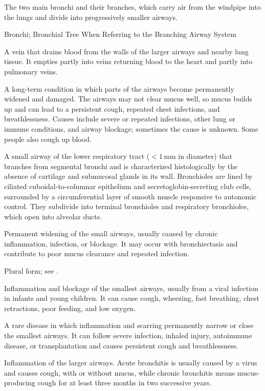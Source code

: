  The two main bronchi and their branches, which carry air from the windpipe into the lungs and divide into progressively smaller airways.

\synonyms
Bronchi; Bronchial Tree When Referring to the Branching Airway System

 A vein that drains blood from the walls of the larger airways and nearby lung tissue. It empties partly into veins returning blood to the heart and partly into pulmonary veins.

 A long-term condition in which parts of the airways become permanently widened and damaged. The airways may not clear mucus well, so mucus builds up and can lead to a persistent cough, repeated chest infections, and breathlessness. Causes include severe or repeated infections, other lung or immune conditions, and airway blockage; sometimes the cause is unknown. Some people also cough up blood.

 A small airway of the lower respiratory tract ($< 1$\,mm in diameter) that branches from segmental bronchi and is characterized histologically by the absence of cartilage and submucosal glands in its wall. Bronchioles are lined by ciliated cuboidal-to-columnar epithelium and secretoglobin-secreting club cells, surrounded by a circumferential layer of smooth muscle responsive to autonomic control. They subdivide into terminal bronchioles and respiratory bronchioles, which open into alveolar ducts.

 Permanent widening of the small airways, usually caused by chronic inflammation, infection, or blockage. It may occur with bronchiectasis and contribute to poor mucus clearance and repeated infection.

 Plural form; see .

 Inflammation and blockage of the smallest airways, usually from a viral infection in infants and young children. It can cause cough, wheezing, fast breathing, chest retractions, poor feeding, and low oxygen.

 A rare disease in which inflammation and scarring permanently narrow or close the smallest airways. It can follow severe infection, inhaled injury, autoimmune disease, or transplantation and causes persistent cough and breathlessness.

 Inflammation of the larger airways. Acute bronchitis is usually caused by a virus and causes cough, with or without mucus, while chronic bronchitis means mucus-producing cough for at least three months in two successive years.

